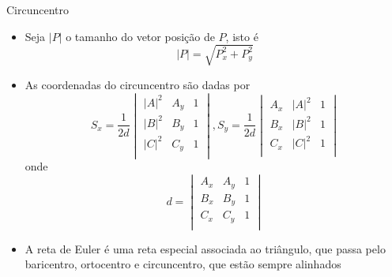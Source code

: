 \begin{frame}[fragile]{Circuncentro}

    \begin{itemize}
        \item Seja $|P|$ o tamanho do vetor posição de $P$, isto é
        \[
            |P| = \sqrt{P_x^2 + P_y^2}
        \]

        \item As coordenadas do circuncentro são dadas por
        \[
            S_x = \frac{1}{2d} \begin{vmatrix}
                |A|^2 & A_y & 1 \\
                |B|^2 & B_y & 1 \\
                |C|^2 & C_y & 1 \\
            \end{vmatrix}, S_y = \frac{1}{2d} \begin{vmatrix}
                A_x & |A|^2 & 1 \\
                B_x & |B|^2 & 1 \\
                C_x & |C|^2 & 1 \\
            \end{vmatrix}
        \]
        onde
        \[
            d = \begin{vmatrix}
                A_x & A_y & 1 \\
                B_x & B_y & 1 \\
                C_x & C_y & 1 \\
            \end{vmatrix}
        \]

        \item A reta de Euler é uma reta especial associada ao triângulo, que passa pelo baricentro, ortocentro e circuncentro, que estão sempre alinhados
    \end{itemize}

\end{frame}

